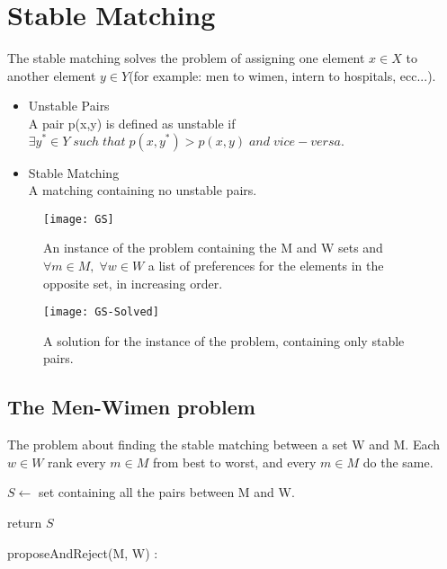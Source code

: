 \section{Stable Matching}
The stable matching solves the problem of assigning one element $x \in X$ to another element $y \in Y$(for example: men to wimen, intern to hospitals, ecc...).

\begin{itemize}
	\item Unstable Pairs\\
	      A pair p(x,y) is defined as unstable if $\exists y^{*} \in Y \; such \;that \;p(x,y^{*}) > p(x,y) \; and \; vice-versa. $

	\item Stable Matching\\
	      A matching containing no unstable pairs.
\end{itemize}


\begin{figure}[h]
	\centering
	\texttt{[image: GS]}
	\caption{An instance of the problem containing the M and W sets and $\forall m \in M, \; \forall w \in W$ a list of preferences for the elements in the opposite set, in increasing order.}
\end{figure}

\begin{figure}[h]
	\centering
	\texttt{[image: GS-Solved]}
	\caption{A solution for the instance of the problem, containing only stable pairs.}
\end{figure}


\subsection{The Men-Wimen problem}
The problem about finding the stable matching between a set W and M. Each $w \in W$ rank every $m \in M$ from best to worst, and every $m \in M$ do the same.

\begin{algorithm}[H]
	\SetAlgoLined
	\small
	\BlankLine

	$S \leftarrow$ set containing all the pairs between M and W.

	\BlankLine
	\BlankLine

	return $S$\;
	\caption{proposeAndReject(M, W) :}
\end{algorithm}

